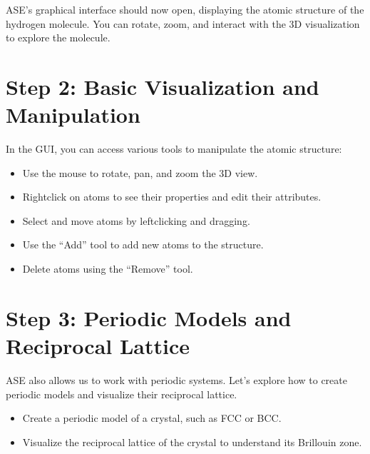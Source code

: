 \documentclass[letterpaper,10pt,english]{sphinxmanual}
\begin{document}
\sphinxAtStartPar
ASE’s graphical interface should now open, displaying the atomic structure of the hydrogen molecule. You can rotate, zoom, and interact with the 3D visualization to explore the molecule.


\section{Step 2: Basic Visualization and Manipulation}
\label{\detokenize{asebasics/asebasics:step-2-basic-visualization-and-manipulation}}
\sphinxAtStartPar
In the GUI, you can access various tools to manipulate the atomic structure:
\begin{itemize}
\item {} 
\sphinxAtStartPar
Use the mouse to rotate, pan, and zoom the 3D view.

\item {} 
\sphinxAtStartPar
Right\sphinxhyphen{}click on atoms to see their properties and edit their attributes.

\item {} 
\sphinxAtStartPar
Select and move atoms by left\sphinxhyphen{}clicking and dragging.

\item {} 
\sphinxAtStartPar
Use the “Add” tool to add new atoms to the structure.

\item {} 
\sphinxAtStartPar
Delete atoms using the “Remove” tool.

\end{itemize}


\section{Step 3: Periodic Models and Reciprocal Lattice}
\label{\detokenize{asebasics/asebasics:step-3-periodic-models-and-reciprocal-lattice}}
\sphinxAtStartPar
ASE also allows us to work with periodic systems. Let’s explore how to create periodic models and visualize their reciprocal lattice.
\begin{itemize}
\item {} 
\sphinxAtStartPar
Create a periodic model of a crystal, such as FCC or BCC.

\item {} 
\sphinxAtStartPar
Visualize the reciprocal lattice of the crystal to understand its Brillouin zone.

\end{itemize}
\end{document}
